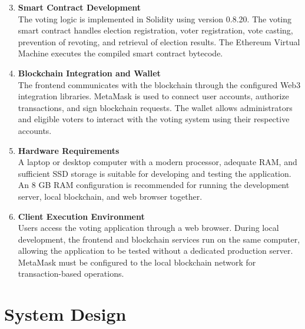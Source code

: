 \documentclass[12pt,a4paper]{report}
\begin{document}
\begin{minipage}[t]{0.48\textwidth}
\begin{enumerate}
    \setcounter{enumi}{2}
    \setlength{\itemsep}{4pt}
    \setlength{\parskip}{0pt}

    \item \textbf{Smart Contract Development}\\
    The voting logic is implemented in Solidity using version 0.8.20. The voting smart contract handles election registration, voter registration, vote casting, prevention of revoting, and retrieval of election results. The Ethereum Virtual Machine executes the compiled smart contract bytecode.

    \item \textbf{Blockchain Integration and Wallet}\\
    The frontend communicates with the blockchain through the configured Web3 integration libraries. MetaMask is used to connect user accounts, authorize transactions, and sign blockchain requests. The wallet allows administrators and eligible voters to interact with the voting system using their respective accounts.

    \item \textbf{Hardware Requirements}\\
    A laptop or desktop computer with a modern processor, adequate RAM, and sufficient SSD storage is suitable for developing and testing the application. An 8 GB RAM configuration is recommended for running the development server, local blockchain, and web browser together.

    \item \textbf{Client Execution Environment}\\
    Users access the voting application through a web browser. During local development, the frontend and blockchain services run on the same computer, allowing the application to be tested without a dedicated production server. MetaMask must be configured to the local blockchain network for transaction-based operations.
\end{enumerate}
\end{minipage}
\endgroup

\chapter{System Design}
\end{document}
